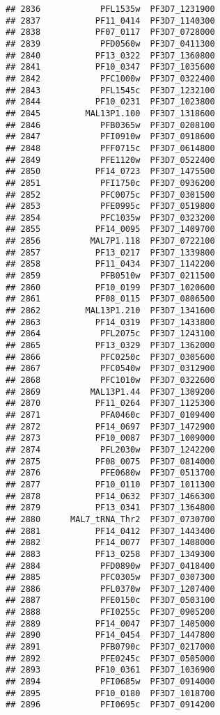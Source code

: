 \documentclass[12pt, a4paper]{article}\usepackage[]{graphicx}\usepackage[]{color}
\makeatletter
\newenvironment{kframe}{%
 \def\at@end@of@kframe{}%
 \ifinner\ifhmode%
  \def\at@end@of@kframe{\end{minipage}}%
  \begin{minipage}{\columnwidth}%
 \fi\fi%
 \def\FrameCommand##1{\hskip\@totalleftmargin \hskip-\fboxsep
 \colorbox{shadecolor}{##1}\hskip-\fboxsep
     \hskip-\linewidth \hskip-\@totalleftmargin \hskip\columnwidth}%
 \MakeFramed {\advance\hsize-\width
   \@totalleftmargin\z@ \linewidth\hsize
   \@setminipage}}%
 {\par\unskip\endMakeFramed%
 \at@end@of@kframe}
\newenvironment{knitrout}{}{} %
\makeatother
\begin{document}
\begin{knitrout}
\begin{kframe}
\begin{verbatim}
## 2836            PFL1535w  PF3D7_1231900
## 2837           PF11_0414  PF3D7_1140300
## 2838           PF07_0117  PF3D7_0728000
## 2839            PFD0560w  PF3D7_0411300
## 2840           PF13_0322  PF3D7_1360800
## 2841           PF10_0347  PF3D7_1035600
## 2842            PFC1000w  PF3D7_0322400
## 2843            PFL1545c  PF3D7_1232100
## 2844           PF10_0231  PF3D7_1023800
## 2845         MAL13P1.100  PF3D7_1318600
## 2846            PFB0365w  PF3D7_0208100
## 2847            PFI0910w  PF3D7_0918600
## 2848            PFF0715c  PF3D7_0614800
## 2849            PFE1120w  PF3D7_0522400
## 2850           PF14_0723  PF3D7_1475500
## 2851            PFI1750c  PF3D7_0936200
## 2852            PFC0075c  PF3D7_0301500
## 2853            PFE0995c  PF3D7_0519800
## 2854            PFC1035w  PF3D7_0323200
## 2855           PF14_0095  PF3D7_1409700
## 2856          MAL7P1.118  PF3D7_0722100
## 2857           PF13_0217  PF3D7_1339800
## 2858           PF11_0434  PF3D7_1142200
## 2859            PFB0510w  PF3D7_0211500
## 2860           PF10_0199  PF3D7_1020600
## 2861           PF08_0115  PF3D7_0806500
## 2862         MAL13P1.210  PF3D7_1341600
## 2863           PF14_0319  PF3D7_1433800
## 2864            PFL2075c  PF3D7_1243100
## 2865           PF13_0329  PF3D7_1362000
## 2866            PFC0250c  PF3D7_0305600
## 2867            PFC0540w  PF3D7_0312900
## 2868            PFC1010w  PF3D7_0322600
## 2869          MAL13P1.44  PF3D7_1309200
## 2870           PF11_0264  PF3D7_1125300
## 2871            PFA0460c  PF3D7_0109400
## 2872           PF14_0697  PF3D7_1472900
## 2873           PF10_0087  PF3D7_1009000
## 2874            PFL2030w  PF3D7_1242200
## 2875           PF08_0075  PF3D7_0814000
## 2876            PFE0680w  PF3D7_0513700
## 2877           PF10_0110  PF3D7_1011300
## 2878           PF14_0632  PF3D7_1466300
## 2879           PF13_0341  PF3D7_1364800
## 2880      MAL7_tRNA_Thr2  PF3D7_0730700
## 2881           PF14_0412  PF3D7_1443400
## 2882           PF14_0077  PF3D7_1408000
## 2883           PF13_0258  PF3D7_1349300
## 2884            PFD0890w  PF3D7_0418400
## 2885            PFC0305w  PF3D7_0307300
## 2886            PFL0370w  PF3D7_1207400
## 2887            PFE0150c  PF3D7_0503100
## 2888            PFI0255c  PF3D7_0905200
## 2889           PF14_0047  PF3D7_1405000
## 2890           PF14_0454  PF3D7_1447800
## 2891            PFB0790c  PF3D7_0217000
## 2892            PFE0245c  PF3D7_0505000
## 2893           PF10_0361  PF3D7_1036900
## 2894            PFI0685w  PF3D7_0914000
## 2895           PF10_0180  PF3D7_1018700
## 2896            PFI0695c  PF3D7_0914200

\end{verbatim}
\end{kframe}
\end{knitrout}
\end{document}
